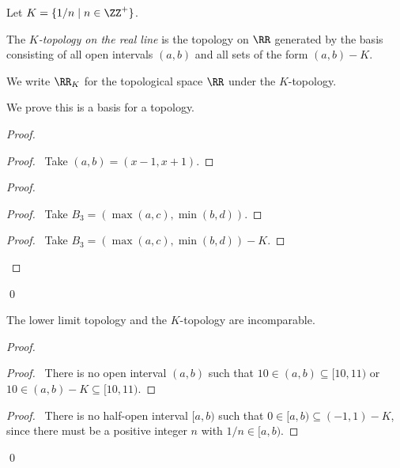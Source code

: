 \begin{definition}
    Let $K = \{ 1/n \mid n \in \ZZ^+ \}$.

    The \emph{$K$-topology on the real line} is the topology on $\RR$ generated by the basis consisting of all open intervals
    $(a,b)$ and all sets of the form $(a,b) - K$.

    We write $\RR_K$ for the topological space $\RR$ under the $K$-topology.
\end{definition}

We prove this is a basis for a topology.

\begin{proof}
    \pf
    \begin{proof}
        \pf\ Take $(a,b) = (x-1,x+1)$.
    \end{proof}
    \begin{proof}
        \begin{proof}
            \pf\ Take $B_3 = (\max (a,c), \min (b,d))$.
        \end{proof}
        \begin{proof}
            \pf\ Take $B_3 = (\max (a,c), \min (b,d)) - K$.
        \end{proof}
    \end{proof}
    \qed
\end{proof}

\begin{lemma}
    The lower limit topology and the $K$-topology are incomparable.
\end{lemma}

\begin{proof}
    \pf
    \step{1}{The interval $[10,11)$ is not open in the $K$-topology.}
    \begin{proof}
        \pf\ There is no open interval $(a,b)$ such that $10 \in (a,b) \subseteq [10,11)$ or
        $10 \in (a,b) - K \subseteq [10,11)$.
    \end{proof}
    \begin{proof}
        \pf\ There is no half-open interval $[a,b)$ such that $0 \in [a,b) \subseteq (-1,1) - K$, since
        there must be a positive integer $n$ with $1/n \in [a,b)$.
    \end{proof}
    \qed
\end{proof}

